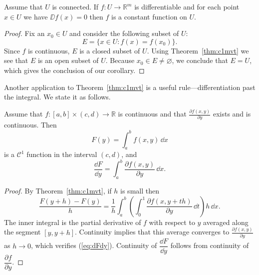 \documentclass[11pt]{article}
\begin{document}
\begin{cor}
  Assume that $U$ is connected.
  If $f: U \to \mathbb{R}^m$ is differentiable and for each point $x \in U$ we have $\DD f(x) = 0$ then $f$ is a constant function on $U$.
\end{cor}

\begin{proof}
  Fix an $x_0 \in U$ and consider the following subset of $U$:
  \[
    E = \{ x \in U \colon f(x) = f(x_0) \}.
  \]
  Since $f$ is continuous, $E$ is a closed subset of $U$.
  Using Theorem~\ref{thm:c1mvt} we see that $E$ is an open subset of $U$.
  Because $x_0 \in E \ne \varnothing$, we conclude that $E = U$, which gives the conclusion of our corollary.
\end{proof}

Another application to Theorem~\ref{thm:c1mvt} is a useful rule---\textsf{differentiation past the integral}.  We state it as follows.

\begin{thm}
  Assume that $f : [a,b] \times (c,d) \to \mathbb{R}$ is continuous and that $\displaystyle \frac{\partial f(x,y)}{\partial y}$ exists and is continuous.
  Then
  \[
    F(y) = \int_a^b f(x,y) \, \dd x
  \]
  is a $\mathcal{C}^1$ function in the interval $(c,d)$, and
  \begin{equation}
    \label{eq:dFdy}
    \frac{\dd F}{\dd y} = \int_a^b \frac{\partial f(x,y)}{\partial y} \, \dd x.
  \end{equation}
\end{thm}

\begin{proof}
  By Theorem~\ref{thm:c1mvt}, if $h$ is small then
  \[
    \frac{F(y+h) - F(y)}{h} = \frac{1}{h} \int_a^b \left( \int_0^1 \frac{ \partial f(x,y+th)}{\partial y} \, \dd t \right) h \, \dd x.
  \]
  The inner integral is the partial derivative of $f$ with respect to $y$ averaged along the segment $[y, y+h]$.
  Continuity implies that this average converges to $\displaystyle \frac{\partial f(x,y)}{\partial y}$ as $h \to 0$, which verifies (\ref{eq:dFdy}).
  Continuity of $\dfrac{\dd F}{\dd y}$ follows from continuity of $\dfrac{\partial f}{\partial y}$.
\end{proof}
\end{document}
